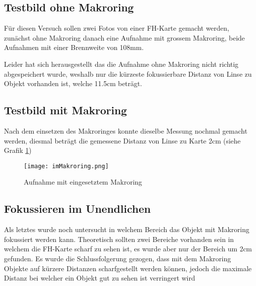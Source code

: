 \subsection{Testbild ohne Makroring}
Für diesen Versuch sollen zwei Fotos von einer FH-Karte gemacht werden, zunächst ohne Makroring danach eine Aufnahme mit grossem Makroring, beide Aufnahmen mit einer Brennweite von 108mm.

Leider hat sich herausgestellt das die Aufnahme ohne Makroring nicht richtig abgespeichert wurde, weshalb nur die kürzeste fokussierbare Distanz von Linse zu Objekt vorhanden ist, welche 11.5cm beträgt.

\subsection{Testbild mit Makroring}
Nach dem einsetzen des Makroringes konnte dieselbe Messung nochmal gemacht werden, diesmal beträgt die gemessene Distanz von Linse zu Karte 2cm (siehe Grafik \ref{fig::imMakroring})

\begin{figure}[ht]
	\centering
	\texttt{[image: imMakroring.png]}
	\caption{Aufnahme mit eingesetztem Makroring}
	\label{fig::imMakroring}
\end{figure}

\subsection{Fokussieren im Unendlichen}
Als letztes wurde noch untersucht in welchem Bereich das Objekt mit Makroring fokussiert werden kann. Theoretisch sollten zwei Bereiche vorhanden sein in welchem die FH-Karte scharf zu sehen ist, es wurde aber nur der Bereich um 2cm gefunden. Es wurde die Schlussfolgerung gezogen, dass mit dem Makroring Objekte auf kürzere Distanzen scharfgestellt werden können, jedoch die maximale Distanz bei welcher ein Objekt gut zu sehen ist verringert wird